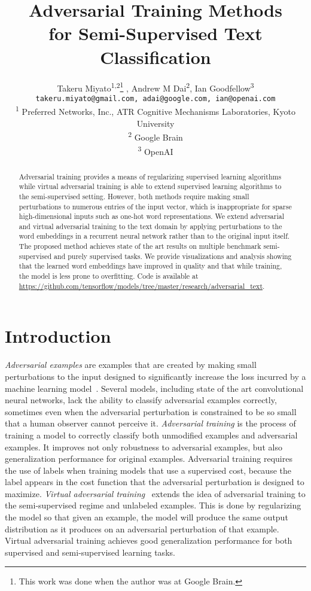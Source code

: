 \documentclass{article}
\title{Adversarial Training Methods \\for Semi-Supervised Text Classification}
\author{
Takeru Miyato\textsuperscript{1,2}\thanks{This work was done when the author was at Google Brain.} , Andrew M Dai\textsuperscript{2}, Ian Goodfellow\textsuperscript{3} \\
\texttt{takeru.miyato@gmail.com, adai@google.com, ian@openai.com} \\
\textsuperscript{1} Preferred Networks, Inc., ATR Cognitive Mechanisms Laboratories, Kyoto University \\
\textsuperscript{2} Google Brain \\
\textsuperscript{3} OpenAI \\
}
\begin{document}
\maketitle

\begin{abstract}
Adversarial training provides a means of regularizing supervised learning
algorithms while virtual adversarial training is able to extend
supervised learning algorithms to the semi-supervised setting.
However, both methods require making small perturbations to numerous
entries of the input vector, which is inappropriate for sparse high-dimensional
inputs such as one-hot word representations.
We extend adversarial and virtual adversarial training to the text domain
by applying perturbations to the word embeddings in a recurrent neural network rather than to the
original input itself.
The proposed method achieves state of the art results on multiple benchmark
semi-supervised and purely supervised tasks.
We provide visualizations and analysis showing that the learned word embeddings
have improved in quality and that while training, the model is less prone to overfitting.
Code is available at \url{https://github.com/tensorflow/models/tree/master/research/adversarial_text}. 
\end{abstract}

\section{Introduction}
{\em Adversarial examples} are examples that are created by making small
perturbations to the input designed to significantly increase the loss
incurred by a machine learning model~\cite[]{szegedy2013intriguing, goodfellow2014explaining}.
Several models, including state of the art convolutional neural networks,
lack the ability to classify adversarial examples correctly, sometimes even
when the adversarial perturbation is constrained to be so small that a human
observer cannot perceive it.
{\em Adversarial training}
is the process of training a model to correctly
classify both unmodified examples and adversarial examples.
It improves not only robustness to adversarial examples, but
also generalization performance for original examples.
Adversarial training requires the use of labels when training models that use
a supervised cost, because the label appears in the cost function that the
adversarial perturbation is designed to maximize.
{\em Virtual adversarial training}~\cite[]{miyato2015distributional} extends the
idea of adversarial training to
the semi-supervised regime and unlabeled examples. This is done by regularizing the model so that given an example, the model will produce the same output
distribution as it produces on an adversarial perturbation
of that example.
Virtual adversarial training achieves good generalization performance for both
supervised and semi-supervised learning tasks.
\end{document}
